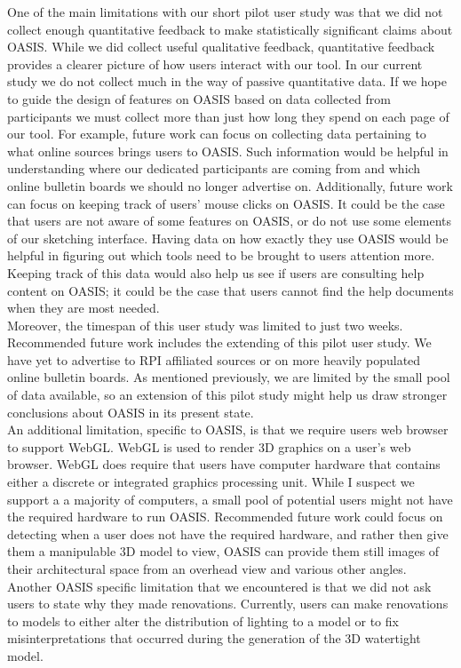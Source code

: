 One of the main limitations with our short pilot user study was that we did not collect enough quantitative feedback to make statistically significant claims about OASIS. While we did collect useful qualitative feedback, quantitative feedback provides a clearer picture of how users interact with our tool. In our current study we do not collect much in the way of passive quantitative data. If we hope to guide the design of features on OASIS based on data collected from participants we must collect more than just how long they spend on each page of our tool.  For example, future work can focus on collecting data pertaining to what online sources brings users to OASIS. Such information would be helpful in understanding where our dedicated participants are coming from and which online bulletin boards we should no longer advertise on. Additionally, future work can focus on keeping track of users' mouse clicks on OASIS.  It could be the case that users are not aware of some features on OASIS, or do not use some elements of our sketching interface. Having data on how exactly they use OASIS would be helpful in figuring out which tools need to be brought to users attention more. Keeping track of this data would also help us see if users are consulting help content on OASIS; it could be the case that users cannot find the help documents when they are most needed.  \\
		
Moreover, the timespan of this user study was limited to just two weeks. Recommended future work includes the extending of this pilot user study. We have yet to advertise to RPI affiliated sources or on more heavily populated online bulletin boards.  As mentioned previously, we are limited by the small pool of data available, so an extension of this pilot study might help us draw stronger conclusions about OASIS in its present state.  \\

An additional limitation, specific to OASIS, is that we require users web browser to support WebGL. WebGL is used to render 3D graphics on a user's web browser. WebGL does require that users have  computer hardware that contains either a  discrete or integrated graphics processing unit. While I suspect we support a a majority of computers, a small pool of potential users might not have the required hardware to run OASIS.  Recommended future work could focus on detecting when a user does not have the required hardware, and rather then give them a manipulable 3D model to view, OASIS can provide them still images of their architectural space from an overhead view and various other angles.  Another OASIS specific limitation that we encountered is that we did not ask users to state why they made renovations.  Currently, users can make renovations to models to either alter the distribution of lighting to a model or to fix misinterpretations that occurred during the generation of the 3D watertight model.\\

